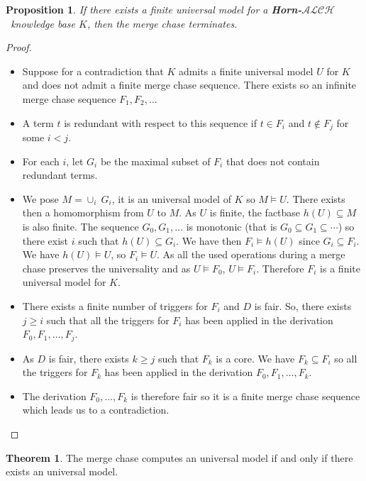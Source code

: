 \documentclass{article}
\newtheorem{proposition}{Proposition}[section]
\theoremstyle{definition}
\newtheorem{theorem}{Theorem}[section]
\theoremstyle{remark}
\newcommand{\ALCH}{\textbf{Horn-$\mathcal{ALCH}$}}
\begin{document}
\begin{proposition}
If there exists a finite universal model for a \ALCH\ knowledge base $K$, then the merge chase terminates.
\end{proposition}

\begin{proof}
\begin{itemize}
\item Suppose for a contradiction that $K$ admits a finite universal model $U$ for $K$ and does not admit a finite merge chase sequence. There exists so an infinite merge chase sequence $F_1, F_2, \ldots$
\item A term $t$ is redundant with respect to this sequence if $t \in F_i$ and $t \notin F_j$ for some $i < j$.
\item For each $i$, let $G_i$ be the maximal subset of $F_i$ that does not contain redundant terms.

\item We pose $M = \cup_i~G_i$, it is an universal model of $K$ so $M \models U$. There exists then a homomorphism from $U$ to $M$. As $U$ is finite, the factbase $h(U)\subseteq M$ is also finite. The sequence $G_0,G_1,\ldots$ is monotonic (that is $G_0 \subseteq G_1 \subseteq \cdots$) so there exist $i$ such that $h(U) \subseteq G_i$. We have then $F_i \models h(U)$ since $G_i \subseteq F_i$. We have $h(U) \models U$, so $F_i\models U$. As all the used operations during a merge chase preserves the universality and as $U \models F_0$, $U \models F_i$. Therefore $F_i$ is a finite universal model for $K$.

\item There exists a finite number of triggers for $F_i$ and $D$ is fair. So, there exists $j \geq i$ such that all the triggers for $F_i$ has been applied in the derivation $F_0,F_1,\ldots,F_j$.

\item As $D$ is fair, there exists $k \geq j$ such that $F_k$ is a core. We have $F_k \subseteq F_i$ so all the triggers for $F_k$ has been applied in the derivation $F_0,F_1,\ldots,F_k$.
\item The derivation $F_0,\ldots,F_k$ is therefore fair so it is a finite merge chase sequence which leads us to a contradiction.
\end{itemize}
\end{proof}


\begin{theorem}
The merge chase computes an universal model if and only if there exists an universal model.
\end{theorem}
\end{document}
